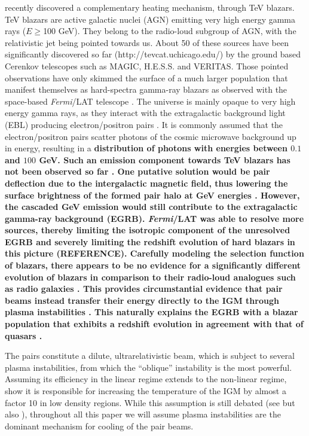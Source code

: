 \documentclass[twocolumns]{emulateapj}
\newcommand\Cc[1]{{\color{blue} \bf #1}} %
\begin{document}
\citet{2012ApJ...752...22B} recently discovered a complementary heating mechanism, through TeV blazars. TeV blazars are active galactic nuclei (AGN) emitting  very high energy gamma rays ($E\ge$100 GeV). They belong to the radio-loud subgroup of AGN, with the relativistic jet being pointed towards us.  About 50 of these sources have been significantly discovered so far (http://tevcat.uchicago.edu/) by the ground based Cerenkov telescopes such as MAGIC, H.E.S.S. and VERITAS. Those pointed observations have only skimmed the surface of a much larger population that manifest themselves as hard-spectra gamma-ray blazars as observed with the space-based \textit{Fermi}/LAT telescope \citep{2014ApJ...790..137B}. The universe is mainly opaque to  very high energy  gamma rays, as they interact with the extragalactic background light (EBL) producing electron/positron pairs \citep{1967PhRv..155.1408G,1992ApJ...390L..49S}.  It is commonly assumed that the electron/positron pairs scatter photons of the cosmic microwave background up in energy, resulting in a \Cc{distribution of photons with energies between $0.1$ and $100$ GeV. Such an emission component towards TeV blazars has not been observed so far \citep{2010A&A...524A..77A,2014A&A...562A.145H}. One putative solution would be pair deflection due to the intergalactic magnetic field, thus lowering the surface brightness of the formed pair halo at GeV energies \citep{2013A&ARv..21...62D,2012ApJ...747L..14V,2011ApJ...733L..21D}. However, the cascaded GeV emission would still contribute to the extragalactic gamma-ray background (EGRB). \textit{Fermi}/LAT was able to resolve more sources, thereby limiting the isotropic component of the unresolved EGRB and severely limiting the redshift evolution of hard blazars in this picture (REFERENCE). Carefully modeling the selection function  of blazars, there appears to be no evidence for a significantly different evolution of blazars in comparison to their radio-loud analogues such as radio galaxies \citep{Giommi:2012,Giommi:2013}. This provides circumstantial evidence that pair beams instead transfer their energy directly to the IGM through plasma instabilities \citep{2012ApJ...752...22B, 2012ApJ...758..102S, 2013ApJ...777...49S, Chang15}. This naturally explains the EGRB with a blazar population that exhibits a redshift evolution in agreement with that of quasars \citep{2014ApJ...790..137B,2013arXiv1308.0015B}.}

The pairs constitute a dilute, ultrarelativistic beam, which is subject to several plasma instabilities, from which the ``oblique'' instability \citep{PhysRevE.70.046401} is the most powerful. Assuming its efficiency in the linear regime extends to the non-linear regime, \citet{2012ApJ...752...23C} show it is responsible for increasing the temperature of the IGM by almost a factor 10 in low density regions. While this assumption is still debated (see \citet{2013ApJ...770...54M,2014ApJ...787...49S} but also \citet{2013ApJ...777...49S,2012ApJ...758..102S,Chang15}), throughout all this paper we will assume plasma instabilities are the dominant mechanism for cooling of the pair beams.
\end{document}
